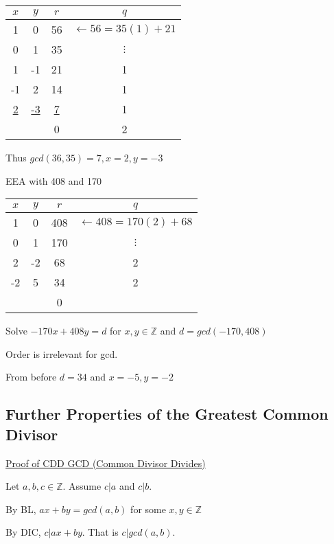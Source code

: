 \documentclass{article}
\begin{document}
\begin{table}[!h]
    \centering
    \begin{tabular}{c|c|c|c} 
         $x$&$y$& $r$ & $q$\\ \hline 
         1& 0 & 56 & $\leftarrow 56 = 35(1) + 21$\\ 
         0& 1 & 35 &$\vdots$\\
         1& -1 & 21 & 1\\ 
         -1& 2 & 14 & 1\\ 
         \underline{2}& \underline{-3} & \underline{7} & 1\\ 
         &  & 0 &2 \\
    \end{tabular}
\end{table}

Thus $gcd(36,35) = 7, x = 2, y = -3$

EEA with 408 and 170

\begin{table}[!h]
    \centering
    \begin{tabular}{c|c|c|c} 
         $x$&$y$& $r$ & $q$\\ \hline 
         1& 0 & 408 & $\leftarrow 408 = 170(2) + 68$\\ 
         0& 1 & 170 &$\vdots$\\
         2& -2 & 68 & 2\\ 
         -2& 5 & 34 & 2\\ 
         &  & 0 & \\
    \end{tabular}
\end{table}

Solve $-170x + 408y = d$ for $x,y \in \mathbb{Z}$ and $d = gcd(-170, 408)$

Order is irrelevant for gcd. 

From before $d = 34$ and $x = -5, y = -2$


\subsection{Further Properties of the Greatest Common Divisor}

\underline{Proof of CDD GCD (Common Divisor Divides)}

Let $a,b,c \in \mathbb{Z}$. Assume $c \vert a$ and $c \vert b$. 

By BL, $ax + by = gcd(a,b)$ for some $x,y \in \mathbb{Z}$

By DIC, $c \vert ax+by$. That is $c \vert gcd(a,b)$.
\end{document}

